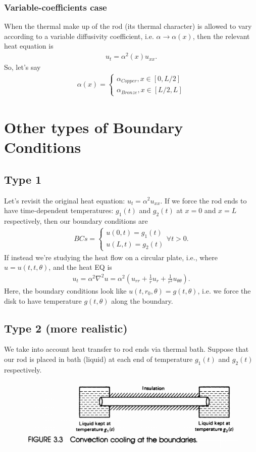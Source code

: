 \documentclass{article}
\theoremstyle{definition}
\begin{document}
\subsubsection{Variable-coefficients case}
When the thermal make up of the rod (its thermal character) is allowed to vary according to a variable diffusivity coefficient, i.e. $\alpha \rightarrow \alpha(x)$, then the relevant heat equation is
\begin{align*}
u_t = \alpha^2(x)u_{xx}.
\end{align*}
So, let's say
\begin{align*}
\alpha(x) = 
\begin{cases*}
\alpha_{Copper}, x\in[0,L/2]\\
\alpha_{Bronze}, x\in[L/2,L]
\end{cases*}
\end{align*}
\newpage
\section{Other types of Boundary Conditions}
\subsection{Type 1}
Let's revisit the original heat equation: $u_t = \alpha^2 u_{xx}$. If we force the rod ends to have time-dependent temperatures: $g_1(t)$ and $g_2(t)$ at $x=0$ and $x=L$ respectively, then our boundary conditions are
\begin{align*}
BCs = 
\begin{cases*}
u(0,t) = g_1(t)\\
u(L,t) = g_2(t)
\end{cases*}
\forall t > 0.
\end{align*} 
If instead we're studying the heat flow on a circular plate, i.e., where $u = u(t,t,\theta)$, and the heat EQ is 
\begin{align*}
u_t = \alpha^2 \nabla^2 u = \alpha^2\left( u_{rr} + \frac{1}{r}u_r + \frac{1}{r^2}u_{\theta\theta} \right).
\end{align*}
Here, the boundary conditions look like $u(t,r_0,\theta) = g(t,\theta)$, i.e. we force the disk to have temperature $g(t,\theta)$ along the boundary.
\subsection{Type 2 (more realistic)}
We take into account heat transfer to rod ends via thermal bath. Suppose that our rod is placed in bath (liquid) at each end of temperature $g_1(t)$ and $g_2(t)$ respectively. 
\begin{figure}[h!]
	\centering
	\includegraphics[scale=0.7]{type2.png}
\end{figure}
\end{document}
